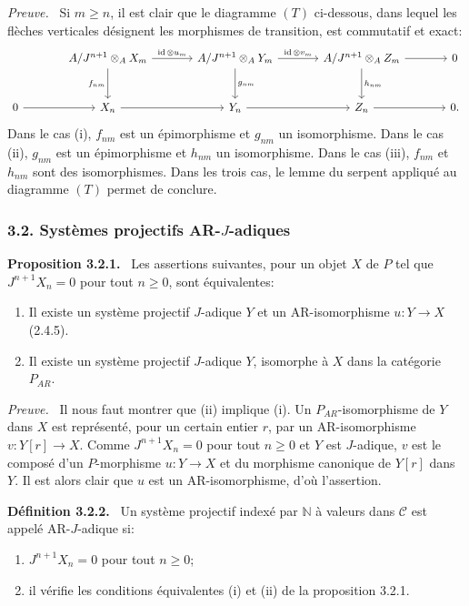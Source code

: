 \documentclass[11pt]{article}
\providecommand{\NN}{\mathbb{N}}
\newenvironment{statement}[1]{\par\medskip\noindent\textbf{#1.}\ }{\par\medskip}
\newenvironment{prooftext}[1][Proof]{\par\noindent\emph{#1.}\ }{\par\medskip}
\providecommand{\id}{\operatorname{id}}
\providecommand{\NN}{\mathbb N}
\providecommand{\cC}{\mathcal C}
\providecommand{\id}{\operatorname{id}}
\providecommand{\id}{\operatorname{id}}
\providecommand{\id}{\operatorname{id}}
\providecommand{\id}{\operatorname{id}}
\providecommand{\cC}{\mathcal C}
\providecommand{\id}{\operatorname{id}}
\begin{document}
\begin{prooftext}[Preuve]
Si $m\ge n$, il est clair que le diagramme $(T)$ ci-dessous, dans lequel les flèches verticales désignent les morphismes de transition, est commutatif et exact:
\[
\begin{tikzcd}[column sep=large,row sep=large]
{} & A/J^{n+1}\otimes_A X_m \arrow[r,"\id\otimes u_m"] \arrow[d,"f_{nm}"'] & A/J^{n+1}\otimes_A Y_m \arrow[r,"\id\otimes v_m"] \arrow[d,"g_{nm}"] & A/J^{n+1}\otimes_A Z_m \arrow[r] \arrow[d,"h_{nm}"] & 0\\
0 \arrow[r] & X_n \arrow[r] & Y_n \arrow[r] & Z_n \arrow[r] & 0 .
\end{tikzcd}
\]
Dans le cas (i), $f_{nm}$ est un épimorphisme et $g_{nm}$ un isomorphisme. Dans le cas (ii), $g_{nm}$ est un épimorphisme et $h_{nm}$ un isomorphisme. Dans le cas (iii), $f_{nm}$ et $h_{nm}$ sont des isomorphismes. Dans les trois cas, le lemme du serpent appliqué au diagramme $(T)$ permet de conclure.
\end{prooftext}

\subsubsection*{3.2. Systèmes projectifs AR-$J$-adiques}
\begin{statement}{Proposition 3.2.1}
Les assertions suivantes, pour un objet $X$ de $P$ tel que $J^{n+1}X_n=0$ pour tout $n\ge0$, sont équivalentes:
\begin{enumerate}[label=(\roman*)]
\item Il existe un système projectif $J$-adique $Y$ et un AR-isomorphisme $u:Y\to X$ (2.4.5).
\item Il existe un système projectif $J$-adique $Y$, isomorphe à $X$ dans la catégorie $P_{AR}$.
\end{enumerate}
\end{statement}

\begin{prooftext}[Preuve]
Il nous faut montrer que (ii) implique (i). Un $P_{AR}$-isomorphisme de $Y$ dans $X$ est représenté, pour un certain entier $r$, par un AR-isomorphisme $v:Y[r]\to X$. Comme $J^{n+1}X_n=0$ pour tout $n\ge0$ et $Y$ est $J$-adique, $v$ est le composé d'un $P$-morphisme $u:Y\to X$ et du morphisme canonique de $Y[r]$ dans $Y$. Il est alors clair que $u$ est un AR-isomorphisme, d'où l'assertion.
\end{prooftext}

\begin{statement}{Définition 3.2.2}
Un système projectif indexé par $\NN$ à valeurs dans $\cC$ est appelé AR-$J$-adique si:
\begin{enumerate}[label=(\alph*)]
\item $J^{n+1}X_n=0$ pour tout $n\ge0$;
\item il vérifie les conditions équivalentes (i) et (ii) de la proposition 3.2.1.
\end{enumerate}
\end{statement}
\end{document}
